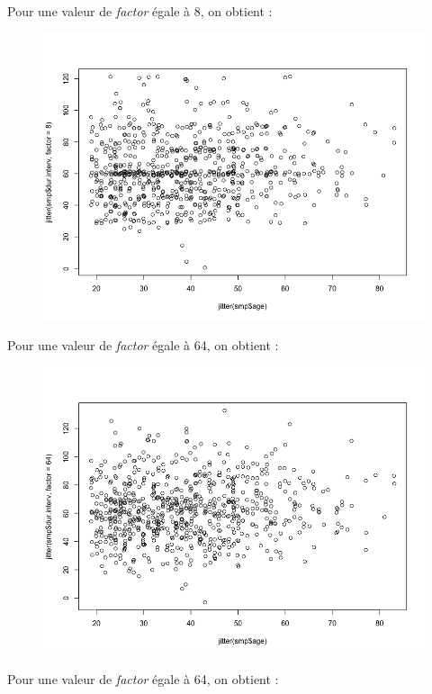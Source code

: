 Pour une valeur de \textit{factor} égale à 8, on obtient : 
\begin{figure}[H]\begin{center}\includegraphics[scale=0.35]{ilu/cp.png}\end{center}\end{figure}
Pour une valeur de \textit{factor} égale à 64, on obtient : 
\begin{figure}[H]\begin{center}\includegraphics[scale=0.35]{ilu/cq.png}\end{center}\end{figure}
Pour une valeur de \textit{factor} égale à 64, on obtient : 
